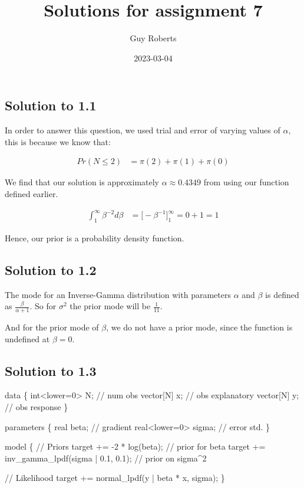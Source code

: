 \documentclass[
]{article}
\title{Solutions for assignment 7}
\author{Guy Roberts}
\date{2023-03-04}
\newenvironment{Shaded}{\begin{snugshade}}{\end{snugshade}}
\newcommand{\NormalTok}[1]{#1}
\begin{document}
\maketitle

\hypertarget{solution-to-1.1}{%
\subsection{Solution to 1.1}\label{solution-to-1.1}}

In order to answer this question, we used trial and error of varying
values of \(\alpha\), this is because we know that:

\begin{align*}
    Pr(N \leq 2) &= \pi(2) + \pi(1) + \pi(0)
\end{align*}

We find that our solution is approximately \(\alpha \approx 0.4349\)
from using our function defined earlier.

\begin{align*}
  \int_{1}^{\infty}\beta^{-2}d\beta &= \biggl[ -\beta^{-1} \biggr]_{1}^{\infty} = 0 + 1 = 1
\end{align*}

Hence, our prior is a probability density function.

\hypertarget{solution-to-1.2}{%
\subsection{Solution to 1.2}\label{solution-to-1.2}}

The mode for an Inverse-Gamma distribution with parameters \(\alpha\)
and \(\beta\) is defined as \(\frac{\beta}{\alpha+1}\). So for
\(\sigma^{2}\) the prior mode will be \(\frac{1}{11}\).

And for the prior mode of \(\beta\), we do not have a prior mode, since
the function is undefined at \(\beta = 0\).

\hypertarget{solution-to-1.3}{%
\subsection{Solution to 1.3}\label{solution-to-1.3}}

\begin{Shaded}
\begin{Highlighting}[]
\NormalTok{data \{}
\NormalTok{  int\textless{}lower=0\textgreater{} N; // num obs}
\NormalTok{  vector[N] x;    // obs explanatory}
\NormalTok{  vector[N] y;    // obs response}
\NormalTok{\}}

\NormalTok{parameters \{}
\NormalTok{  real beta;           // gradient}
\NormalTok{  real\textless{}lower=0\textgreater{} sigma; // error std.}
\NormalTok{\}}

\NormalTok{model \{}
\NormalTok{  // Priors}
\NormalTok{  target += {-}2 * log(beta); // prior for beta}
\NormalTok{  target += inv\_gamma\_lpdf(sigma | 0.1, 0.1); // prior on sigma\^{}2}
  
\NormalTok{  // Likelihood}
\NormalTok{  target += normal\_lpdf(y | beta * x, sigma);}
\NormalTok{\}}
\end{Highlighting}
\end{Shaded}
\end{document}
